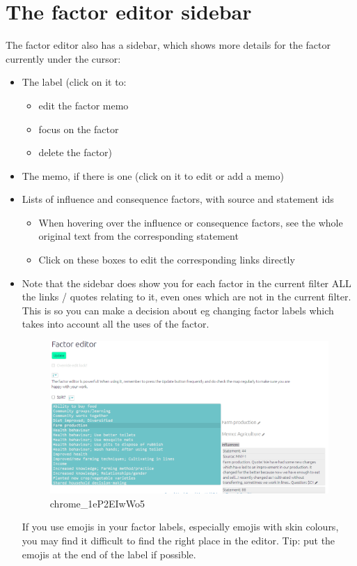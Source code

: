 \documentclass[
]{book}
\providecommand{\tightlist}{%
  \setlength{\itemsep}{0pt}\setlength{\parskip}{0pt}}
\begin{document}
\hypertarget{xfactor-editor-sidebar}{%
\section{The factor editor sidebar}\label{xfactor-editor-sidebar}}

The factor editor also has a sidebar, which shows more details for the factor currently under the cursor:

\begin{itemize}
\item
  The label (click on it to:

  \begin{itemize}
  \tightlist
  \item
    edit the factor memo
  \item
    focus on the factor
  \item
    delete the factor)
  \end{itemize}
\item
  The memo, if there is one (click on it to edit or add a memo)
\item
  Lists of influence and consequence factors, with source and statement ids

  \begin{itemize}
  \tightlist
  \item
    When hovering over the influence or consequence factors, see the whole original text from the corresponding statement
  \item
    Click on these boxes to edit the corresponding links directly
  \end{itemize}
\item
  Note that the sidebar does show you for each factor in the current filter ALL the links / quotes relating to it, even ones which are not in the current filter. This is so you can make a decision about eg changing factor labels which takes into account all the uses of the factor.

  \begin{figure}
  \centering
  \includegraphics[width=6.77083in,height=\textheight]{_assets/chrome_1eP2EIwWo5.gif}
  \caption{chrome\_1eP2EIwWo5}
  \end{figure}

  If you use emojis in your factor labels, especially emojis with skin colours, you may find it difficult to find the right place in the editor. Tip: put the emojis at the end of the label if possible.
\end{itemize}
\end{document}

